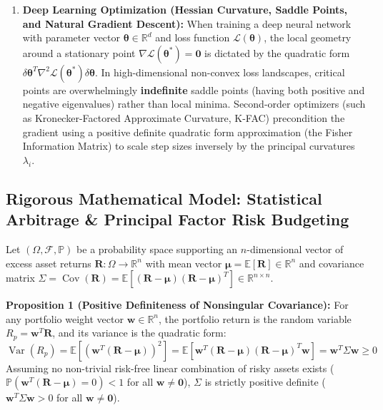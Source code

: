 \documentclass[11pt, letterpaper]{article}
\theoremstyle{definition}
\theoremstyle{remark}
\begin{document}
\begin{enumerate}
    \item \textbf{Deep Learning Optimization (Hessian Curvature, Saddle Points, and Natural Gradient Descent):}
    When training a deep neural network with parameter vector $\boldsymbol{\theta} \in \mathbb{R}^d$ and loss function $\mathcal{L}(\boldsymbol{\theta})$, the local geometry around a stationary point $\nabla \mathcal{L}(\boldsymbol{\theta}^*) = \mathbf{0}$ is dictated by the quadratic form $\delta \boldsymbol{\theta}^T \nabla^2 \mathcal{L}(\boldsymbol{\theta}^*) \delta \boldsymbol{\theta}$. In high-dimensional non-convex loss landscapes, critical points are overwhelmingly \textbf{indefinite} saddle points (having both positive and negative eigenvalues) rather than local minima. Second-order optimizers (such as Kronecker-Factored Approximate Curvature, K-FAC) precondition the gradient using a positive definite quadratic form approximation (the Fisher Information Matrix) to scale step sizes inversely by the principal curvatures $\lambda_i$.
\end{enumerate}

\subsection{Rigorous Mathematical Model: Statistical Arbitrage \& Principal Factor Risk Budgeting}
Let $(\Omega, \mathcal{F}, \mathbb{P})$ be a probability space supporting an $n$-dimensional vector of excess asset returns $\mathbf{R} : \Omega \to \mathbb{R}^n$ with mean vector $\boldsymbol{\mu} = \mathbb{E}[\mathbf{R}] \in \mathbb{R}^n$ and covariance matrix $\Sigma = \operatorname{Cov}(\mathbf{R}) = \mathbb{E}[(\mathbf{R} - \boldsymbol{\mu})(\mathbf{R} - \boldsymbol{\mu})^T] \in \mathbb{R}^{n \times n}$.

\textbf{Proposition 1 (Positive Definiteness of Nonsingular Covariance):}
For any portfolio weight vector $\mathbf{w} \in \mathbb{R}^n$, the portfolio return is the random variable $R_p = \mathbf{w}^T \mathbf{R}$, and its variance is the quadratic form:
\[
\operatorname{Var}(R_p) = \mathbb{E}\left[ (\mathbf{w}^T (\mathbf{R} - \boldsymbol{\mu}))^2 \right] = \mathbb{E}\left[ \mathbf{w}^T (\mathbf{R} - \boldsymbol{\mu})(\mathbf{R} - \boldsymbol{\mu})^T \mathbf{w} \right] = \mathbf{w}^T \Sigma \mathbf{w} \ge 0
\]
Assuming no non-trivial risk-free linear combination of risky assets exists ($\mathbb{P}(\mathbf{w}^T(\mathbf{R}-\boldsymbol{\mu}) = 0) < 1$ for all $\mathbf{w} \neq \mathbf{0}$), $\Sigma$ is strictly positive definite ($\mathbf{w}^T \Sigma \mathbf{w} > 0$ for all $\mathbf{w} \neq \mathbf{0}$).
\end{document}
